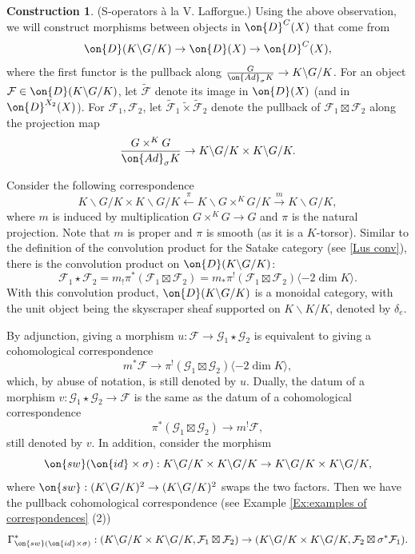 \documentclass[11pt]{amsart}
\theoremstyle{definition}
\theoremstyle{definition}
\newtheorem{construction}[thm]{Construction}
\theoremstyle{definition}
\numberwithin{equation}{subsection}
\newcommand{\mF}{{\mathcal F}}
\newcommand{\mG}{{\mathcal G}}
\newcommand{\Ad}{{\on{Ad}}}
\newcommand{\id}{{\on{id}}}
\begin{document}
\begin{construction}
\label{Con: S}
(S-operators \`a la V. Lafforgue.)
Using the above observation, we will construct morphisms between objects in $\on{D}^C(X)$ that come from
\[\on{D}(K\backslash G/K)\to \on{D}(X)\to\on{D}^{C}(X),\]
where the first functor is the pullback along $\frac{G}{\Ad_\sigma K}\to K\backslash G/K$. For an object $\mF\in \on{D}(K\backslash G/K)$, let $\widetilde\mF$ denote its image in $\on{D}(X)$ (and in $\on{D}^{X_2}(X)$). For $\mF_1,\mF_2$, let
$\widetilde\mF_1\tilde\times\widetilde\mF_2$ denote the pullback of $\mF_1\boxtimes\mF_2$ along the projection map 
$$\frac{G\times^KG}{\Ad_\sigma K}\to K\backslash G/K\times K\backslash G/K.$$

Consider the following correspondence
\begin{equation*}
\label{E:Conv corr}
K\backslash G/K\times K\backslash G/K\xleftarrow{\pi} K\backslash G\times^KG/K\xrightarrow{m} K\backslash G/K,
\end{equation*}
where $m$ is induced by multiplication $G\times^K G\to G$ and $\pi$ is the natural projection. Note that $m$ is proper and $\pi$ is smooth (as it is a $K$-torsor).
Similar to the definition of the convolution product for the Satake category (see \eqref{Lus conv}), there is the convolution product on $\on{D}(K\backslash G/K)$:
\begin{equation}
\label{Lus conv2}
\mF_1\star \mF_2=m_!\pi^*(\mF_1\boxtimes\mF_2)=m_*\pi^!(\mF_1\boxtimes\mF_2)\langle-2\dim K\rangle.
\end{equation}
With this convolution product, $\on{D}(K\backslash G/K)$ is a monoidal category, with the unit object being the skyscraper sheaf supported on $K\backslash K/K$, denoted by $\delta_e$.

By adjunction, giving a morphism $u: \mF\to \mG_1\star \mG_2$ is equivalent to giving a cohomological correspondence
\begin{equation*}
\label{E: creation corr}
m^*\mF\to\pi^!(\mG_1\boxtimes\mG_2)\langle-2\dim K\rangle,
\end{equation*}
which, by abuse of notation, is still denoted by $u$. Dually, the datum of a morphism $v:\mG_1\star\mG_2\to \mF$ is the same as the datum of a cohomological correspondence
\begin{equation*}
\label{E: ann corr}
\pi^*(\mG_1\boxtimes\mG_2)\to m^!\mF,
\end{equation*}
still denoted by $v$. In addition, consider the morphism
\[\on{sw}(\id\times \sigma): K\backslash G/K\times K\backslash G/K\to K\backslash G/K\times K\backslash G/K,\]
where $\on{sw}: (K\backslash G/K)^2\to (K\backslash G/K)^2$ swaps the two factors. Then we have the pullback cohomological correspondence (see Example \ref{Ex:examples of correspondences} (2))
\begin{equation} 
\label{E: Frob corr}
\Gamma_{\on{sw}(\id\times\sigma)}^*: (K\backslash G/K\times K\backslash G/K, \mF_1\boxtimes \mF_2)\to (K\backslash G/K\times K\backslash G/K, \mF_2\boxtimes \sigma^*\mF_1).
\end{equation}




\end{construction}
\end{document}
